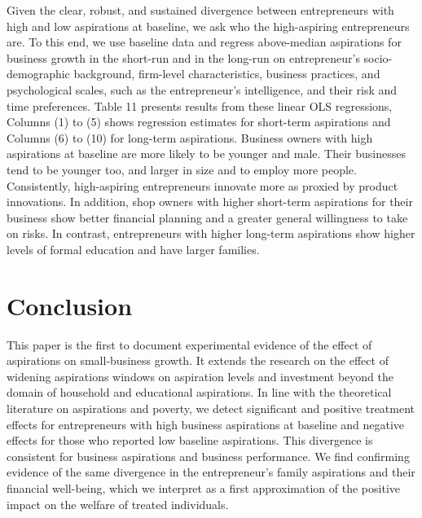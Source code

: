 \documentclass[11.5pt]{article}
\begin{document}
Given the clear, robust, and sustained divergence between entrepreneurs with high and low aspirations at baseline, we ask who the high-aspiring entrepreneurs are. To this end, we use baseline data and regress above-median aspirations for business growth in the short-run and in the long-run on entrepreneur's socio-demographic background, firm-level characteristics, business practices, and psychological scales, such as the entrepreneur's intelligence, and their risk and time preferences. Table 11 presents results from these linear OLS regressions, Columns (1) to (5) shows regression estimates for short-term aspirations and Columns (6) to (10) for long-term aspirations. Business owners with high aspirations at baseline are more likely to be younger and male. Their businesses tend to be younger too, and larger in size and to employ more people. Consistently, high-aspiring entrepreneurs innovate more as proxied by product innovations. In addition, shop owners with higher short-term aspirations for their business show better financial planning and a greater general willingness to take on risks. In contrast, entrepreneurs with higher long-term aspirations show higher levels of formal education and have larger families.



\section{Conclusion}\label{sec.conc}

This paper is the first to document experimental evidence of the effect of aspirations on small-business growth. It extends the research on the effect of widening aspirations windows on aspiration levels and investment beyond the domain of household and educational aspirations. In line with the theoretical literature on aspirations and poverty, we detect significant and positive treatment effects for entrepreneurs with high business aspirations at baseline and negative effects for those who reported low baseline aspirations. This divergence is consistent for business aspirations and business performance. We find confirming evidence of the same divergence in the entrepreneur's family aspirations and their financial well-being, which we interpret as a first approximation of the positive impact on the welfare of treated individuals.
\end{document}
